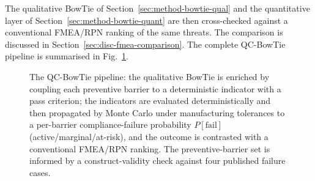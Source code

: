 The qualitative BowTie of
Section~\ref{sec:method-bowtie-qual} and the quantitative layer of
Section~\ref{sec:method-bowtie-quant} are then cross-checked against a
conventional FMEA/RPN ranking of the same threats. The comparison is
discussed in Section~\ref{sec:disc-fmea-comparison}. The complete
QC-BowTie pipeline is summarised in Fig.~\ref{fig:flow}.

\begin{figure}[!htbp]
 \centering
 \resizebox{\linewidth}{!}{}
 \caption{The QC-BowTie pipeline: the qualitative BowTie is enriched by coupling each preventive barrier to a deterministic indicator with a pass criterion; the indicators are evaluated deterministically and then propagated by Monte Carlo under manufacturing tolerances to a per-barrier compliance-failure probability $P[\mathrm{fail}]$ (active/marginal/at-risk), and the outcome is contrasted with a conventional FMEA/RPN ranking. The preventive-barrier set is informed by a construct-validity check against four published failure cases.}\label{fig:flow}
\end{figure}
